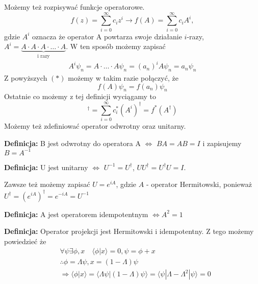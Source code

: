 \iffalse
\textbf{Definicja:} Operator sprzężony $A^{\dagger}$ definiujemy następująco
\begin{equation*}
	\langle x | A^{\dagger} | \psi \rangle = \langle (Ax)  | \psi \rangle = \langle \psi | A | x \rangle^{*}
\end{equation*}
\fi

Możemy też rozpisywać funkcje operatorowe.
\begin{equation*}
	f(z) = \sum_{i = 0}^{\infty} c_i z^i \rightarrow f(A) = \sum_{i = 0}^{\infty} c_i A^i,
\end{equation*}
gdzie $A^i$ oznacza że operator A powtarza swoje działanie $i$-razy, $A^i = \underbrace{A \cdot A \cdot A \cdot \dotsc \cdot A}_{\text{i razy}}$.
W ten sposób możemy zapisać
\begin{equation*}
	\begin{split}
		A^i \psi_n = A \cdot \dotsc \cdot A \psi_n = (a_n)^i
		A\psi_n = a_n \psi_n
	\end{split}
\end{equation*}
Z powyższych $(*)$ możemy w takim razie połączyć, że
\begin{equation*}
	f(A) \psi_n = f(a_n) \psi_n
\end{equation*}
Ostatnie co możemy z tej definicji wyciągamy to
\begin{equation*}
	[f(A)]^{\dagger} = \sum_{i = 0}^{\infty} c_i^* (A^i)^{\dagger} = f^*(A^{\dagger})
\end{equation*}
Możemy też zdefiniować operator odwrotny oraz unitarny.

\textbf{Definicja:} B jest odwrotny do operatora A $\iff$ $BA = AB = I$ i zapisujemy $B = A^{-1}$

\textbf{Definicja:} U jest unitarny $\iff$ $U^{-1} = U^{\dagger}$, $U U^{\dagger} = U^{\dagger} U = I$. 

Zawsze też możemy zapisać $U = e^{iA}$, gdzie $A$ - operator Hermitowski, ponieważ \newline $U^{\dagger} = (e^{iA})^{\dagger} = e^{-iA} = U^{-1} $

\textbf{Definicja:} A jest operatorem idempotentnym $\iff A^2 = 1$

\textbf{Definicja:} Operator projekcji jest Hermitowski i idempotentny.
Z tego możemy powiedzieć że 
\begin{equation*}
	\begin{split}
		&\forall \psi \exists \phi, x \quad \langle \phi | x \rangle = 0, \psi = \phi + x \\
		&\therefore \phi = \Lambda \psi, x = (1 - \Lambda) \psi  \\
		&\Rightarrow \langle \phi | x \rangle = \langle \Lambda \psi | (1 - \Lambda) \psi \rangle =  \langle  \psi | \Lambda - \Lambda^2 | \psi \rangle = 0 
	\end{split}
\end{equation*}

